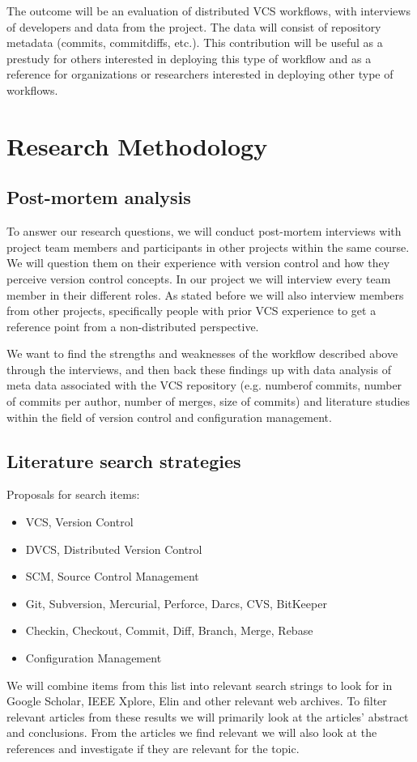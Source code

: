 \documentclass{article}
\begin{document}
The outcome will be an evaluation of distributed VCS workflows, with
interviews of developers and data from the project. The data will
consist of repository metadata (commits, commitdiffs, etc.). This
contribution will be useful as a prestudy for others interested in
deploying this type of workflow and as a reference for organizations or
researchers interested in deploying other type of workflows.

\section{Research Methodology}

\subsection{Post-mortem analysis}
To answer our research questions, we will conduct post-mortem
interviews with project team members and participants in other
projects within the same course. We will question them on their
experience with version control and how they perceive version control
concepts. In our project we will interview every team member in their
different roles. As stated before we will also interview members from
other projects, specifically people with prior VCS experience to get a
reference point from a non-distributed perspective.

We want to find the strengths and weaknesses of the workflow described
above through the interviews, and then back these findings up with
data analysis of meta data associated with the VCS repository
(e.g. numberof commits, number of commits per author, number of
merges, size of commits) and literature studies within the field of
version control and configuration management.

\subsection{Literature search strategies}

Proposals for search items:
\begin{itemize}
  \item VCS, Version Control
  \item DVCS, Distributed Version Control
  \item SCM, Source Control Management
  \item Git, Subversion, Mercurial, Perforce, Darcs, CVS, BitKeeper
  \item Checkin, Checkout, Commit, Diff, Branch, Merge, Rebase
  \item Configuration Management
\end{itemize}

We will combine items from this list into relevant search strings to
look for in Google Scholar, IEEE Xplore, Elin and other relevant web
archives.  To filter relevant articles from these results we will
primarily look at the articles' abstract and conclusions. From the
articles we find relevant we will also look at the references and
investigate if they are relevant for the topic.



\end{document}
